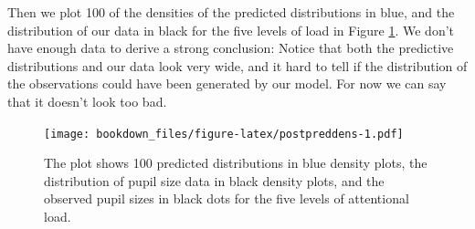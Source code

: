 \documentclass[12pt,]{krantz}
\newenvironment{Shaded}{\begin{snugshade}}{\end{snugshade}}
\newcommand{\DataTypeTok}[1]{\textcolor[rgb]{0.13,0.29,0.53}{#1}}
\newcommand{\DecValTok}[1]{\textcolor[rgb]{0.00,0.00,0.81}{#1}}
\newcommand{\FloatTok}[1]{\textcolor[rgb]{0.00,0.00,0.81}{#1}}
\newcommand{\KeywordTok}[1]{\textcolor[rgb]{0.13,0.29,0.53}{\textbf{#1}}}
\newcommand{\NormalTok}[1]{#1}
\newcommand{\OperatorTok}[1]{\textcolor[rgb]{0.81,0.36,0.00}{\textbf{#1}}}
\newcommand{\OtherTok}[1]{\textcolor[rgb]{0.56,0.35,0.01}{#1}}
\newcommand{\StringTok}[1]{\textcolor[rgb]{0.31,0.60,0.02}{#1}}
\theoremstyle{definition}
\theoremstyle{definition}
\theoremstyle{definition}
\theoremstyle{remark}
\begin{document}
Then we plot 100 of the densities of the predicted distributions in blue, and the distribution of our data in black for the five levels of load in Figure \ref{fig:postpreddens}. We don't have enough data to derive a strong conclusion: Notice that both the predictive distributions and our data look very wide, and it hard to tell if the distribution of the observations could have been generated by our model. For now we can say that it doesn't look too bad.



\begin{Shaded}
\end{Shaded}

\begin{figure}
\centering
\texttt{[image: bookdown\_files/figure-latex/postpreddens-1.pdf]}
\caption{\label{fig:postpreddens}The plot shows 100 predicted distributions in blue density plots, the distribution of pupil size data in black density plots, and the observed pupil sizes in black dots for the five levels of attentional load.}
\end{figure}
\end{document}
